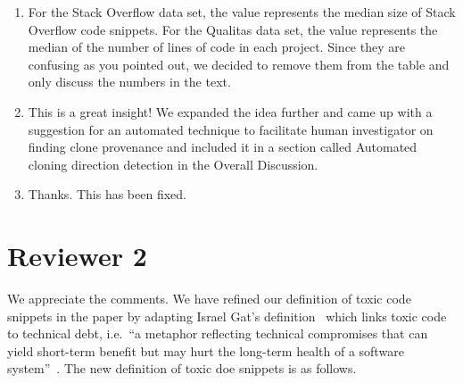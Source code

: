 \documentclass[a4paper,twoside,10pt]{reviewresponse}
\begin{document}
\begin{enumerate} 
	\item For the Stack Overflow data set, the value represents
	the median size of Stack Overflow code snippets. For the Qualitas data set, the
	value represents the median of the number of lines of code in each project. Since
	they are confusing as you pointed out, we decided to remove them from the table
	and only discuss the numbers in the text. 
	\item This is a great insight! We expanded the idea further and came up with a suggestion for an
	automated technique to facilitate human investigator on finding clone provenance and
	included it in a section called Automated cloning direction detection in the
	Overall Discussion. 
	\item Thanks. This has been fixed. \end{enumerate}

\section{Reviewer 2}


We appreciate the comments. We have refined our definition of toxic code
snippets in the paper by adapting Israel Gat's definition~\citep{toxiccode}
which links toxic code to technical debt, i.e.~``a metaphor reflecting technical
compromises that can yield short-term benefit but may hurt the long-term health
of a software system''~\citep{Li2015}. The new definition of toxic doe snippets
is as follows.
\end{document}
